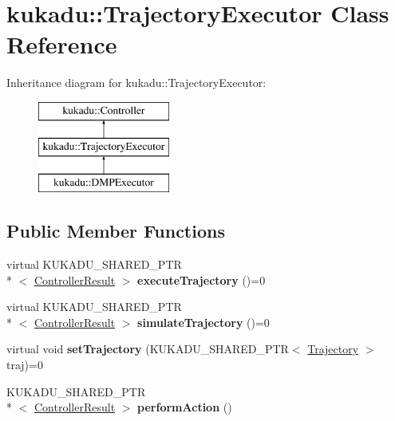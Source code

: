\hypertarget{classkukadu_1_1TrajectoryExecutor}{\section{kukadu\-:\-:Trajectory\-Executor Class Reference}
\label{classkukadu_1_1TrajectoryExecutor}
}
Inheritance diagram for kukadu\-:\-:Trajectory\-Executor\-:\begin{figure}[H]
\begin{center}
\leavevmode
\includegraphics[height=3.000000cm]{classkukadu_1_1TrajectoryExecutor}
\end{center}
\end{figure}
\subsection*{Public Member Functions}
\begin{DoxyCompactItemize}
\item 
\hypertarget{classkukadu_1_1TrajectoryExecutor_a1b2a048b979663d8ed21a3b5652528a4}{virtual K\-U\-K\-A\-D\-U\-\_\-\-S\-H\-A\-R\-E\-D\-\_\-\-P\-T\-R\\*
$<$ \hyperlink{classkukadu_1_1ControllerResult}{Controller\-Result} $>$ {\bfseries execute\-Trajectory} ()=0}\label{classkukadu_1_1TrajectoryExecutor_a1b2a048b979663d8ed21a3b5652528a4}

\item 
\hypertarget{classkukadu_1_1TrajectoryExecutor_a684f7dda54b842e91f969f8a7385350d}{virtual K\-U\-K\-A\-D\-U\-\_\-\-S\-H\-A\-R\-E\-D\-\_\-\-P\-T\-R\\*
$<$ \hyperlink{classkukadu_1_1ControllerResult}{Controller\-Result} $>$ {\bfseries simulate\-Trajectory} ()=0}\label{classkukadu_1_1TrajectoryExecutor_a684f7dda54b842e91f969f8a7385350d}

\item 
\hypertarget{classkukadu_1_1TrajectoryExecutor_ac349c2570306fc32731f34ee05e92741}{virtual void {\bfseries set\-Trajectory} (K\-U\-K\-A\-D\-U\-\_\-\-S\-H\-A\-R\-E\-D\-\_\-\-P\-T\-R$<$ \hyperlink{classkukadu_1_1Trajectory}{Trajectory} $>$ traj)=0}\label{classkukadu_1_1TrajectoryExecutor_ac349c2570306fc32731f34ee05e92741}

\item 
\hypertarget{classkukadu_1_1TrajectoryExecutor_a2924f2e9972a138f9d67c2477303d79e}{K\-U\-K\-A\-D\-U\-\_\-\-S\-H\-A\-R\-E\-D\-\_\-\-P\-T\-R\\*
$<$ \hyperlink{classkukadu_1_1ControllerResult}{Controller\-Result} $>$ {\bfseries perform\-Action} ()}\label{classkukadu_1_1TrajectoryExecutor_a2924f2e9972a138f9d67c2477303d79e}

\end{DoxyCompactItemize}
